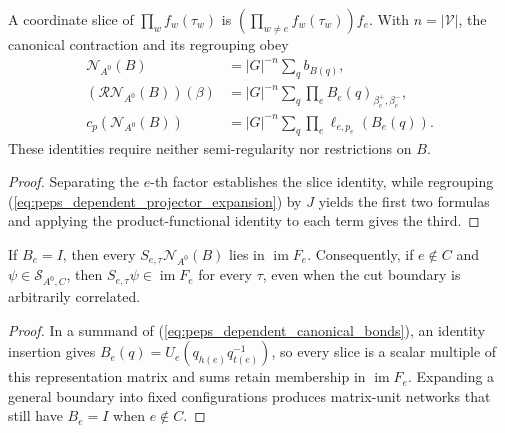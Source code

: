 \begin{lemma}%
    \label{thm:peps_dependent_canonical_bond_sum}
    \leanok
    A coordinate slice of $\prod_w f_w(\tau_w)$ is
    $(\prod_{w\ne e}f_w(\tau_w))f_e$.
    With $n=|\mathcal V|$, the canonical contraction and its regrouping obey
    \begin{align}
        \mathcal N_{A^0}(B) & =|G|^{-n}\sum_q b_{B(q)},
        \label{eq:peps_dependent_canonical_bonds}                                           \\
        (\mathcal R\mathcal N_{A^0}(B))(\beta)
                            & =|G|^{-n}\sum_q\prod_e B_e(q)_{\beta_e^+,\beta_e^-},\nonumber \\
        c_p(\mathcal N_{A^0}(B))
                            & =|G|^{-n}\sum_q\prod_e\ell_{e,p_e}(B_e(q)).\nonumber
    \end{align}
    These identities require neither semi-regularity nor restrictions on $B$.
\end{lemma}
\begin{proof}\leanok
    Separating the $e$-th factor establishes the slice identity, while
    regrouping (\ref{eq:peps_dependent_projector_expansion}) by $J$ yields the
    first two formulas and applying the product-functional identity to each
    term gives the third.
\end{proof}

\begin{lemma}%
    \label{thm:peps_dependent_uncut_support}
    \leanok
    If $B_e=I$, then every $S_{e,\tau}\mathcal N_{A^0}(B)$ lies in
    $\operatorname{im}F_e$. Consequently, if $e\notin C$ and
    $\psi\in\mathcal S_{A^0,C}$, then
    $S_{e,\tau}\psi\in\operatorname{im}F_e$ for every $\tau$, even when
    the cut boundary is arbitrarily correlated.
\end{lemma}
\begin{proof}\leanok
    In a summand of (\ref{eq:peps_dependent_canonical_bonds}), an identity
    insertion gives $B_e(q)=U_e(q_{h(e)}q_{t(e)}^{-1})$, so
    every slice is a scalar multiple of this representation matrix and sums
    retain membership in $\operatorname{im}F_e$.
    Expanding a general boundary into fixed configurations produces
    matrix-unit networks that still have $B_e=I$ when $e\notin C$.
\end{proof}


